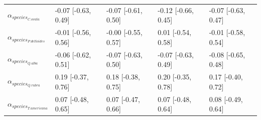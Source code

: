 \documentclass{article}\usepackage[]{graphicx}\usepackage[]{xcolor}
\begin{document}
\begin{table}[ht]
\begin{tabular}{lllll}
  $\alpha_{species_{C. ovata}}$ & -0.07 [-0.63, 0.49] & -0.07 [-0.61, 0.50] & -0.12 [-0.66, 0.45] & -0.07 [-0.63, 0.47] \\ 
  $\alpha_{species_{P. deltoides}}$ & -0.01 [-0.56, 0.56] & -0.00 [-0.55, 0.57] & 0.01 [-0.54, 0.58] & -0.01 [-0.58, 0.54] \\ 
  $\alpha_{species_{Q. alba}}$ & -0.06 [-0.62, 0.51] & -0.07 [-0.63, 0.50] & -0.07 [-0.63, 0.49] & -0.08 [-0.65, 0.48] \\ 
  $\alpha_{species_{Q. rubra}}$ & 0.19 [-0.37, 0.76] & 0.18 [-0.38, 0.75] & 0.20 [-0.35, 0.78] & 0.17 [-0.40, 0.72] \\ 
  $\alpha_{species_{T. americana}}$ & 0.07 [-0.48, 0.65] & 0.07 [-0.47, 0.66] & 0.07 [-0.48, 0.64] & 0.08 [-0.49, 0.64] \\ 
   \hline
\end{tabular}
\end{table}
\end{document}
